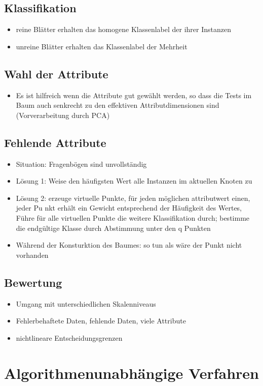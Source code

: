 \documentclass{article} %
\begin{document}
	\subsection{Klassifikation}
	\begin{itemize}
		\item reine Blätter erhalten das homogene Klassenlabel der ihrer Instanzen
		\item unreine Blätter erhalten das Klassenlabel der Mehrheit
	\end{itemize}
	\subsection{Wahl der Attribute}
	\begin{itemize}
		\item Es ist hilfreich wenn die Attribute gut gewählt werden, so dass die Tests im Baum auch senkrecht zu den effektiven Attributdimensionen sind (Vorverarbeitung durch PCA)
	\end{itemize}
	\subsection{Fehlende Attribute}
	\begin{itemize}
		\item Situation: Fragenbögen sind unvollständig
		\item Lösung 1: Weise den häufigsten Wert alle Instanzen im aktuellen Knoten zu
		\item Lösung 2: erzeuge virtuelle Punkte, für jeden möglichen attributwert einen, jeder Pu nkt erhält ein Gewicht entsprechend der Häufigkeit des Wertes, Führe für alle virtuellen Punkte die weitere Klassifikation durch; bestimme die endgültige Klasse durch Abstimmung unter den q Punkten
		\item Während der Konsturktion des Baumes: so tun als wäre der Punkt nicht vorhanden
	\end{itemize}
	\subsection{Bewertung}
	\begin{itemize}
		\item Umgang mit unterschiedlichen Skalenniveaus
		\item Fehlerbehaftete Daten, fehlende Daten, viele Attribute
		\item nichtlineare Entscheidungsgrenzen
	\end{itemize}
\section{Algorithmenunabhängige Verfahren}
\end{document}
